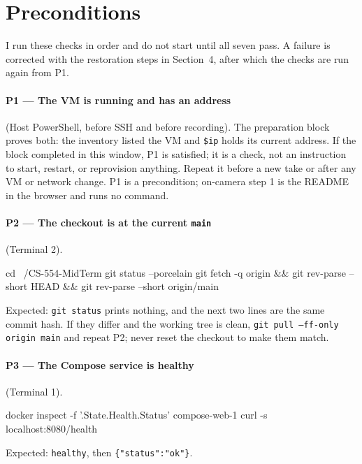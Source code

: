 \documentclass[11pt,letterpaper]{article}
\newcommand{\code}[1]{\texttt{#1}}
\begin{document}
\section{Preconditions}

I run these checks in order and do not start until all seven pass. A failure is corrected with the restoration steps in Section~4, after which the checks are run again from P1.

\paragraph{P1 --- The VM is running and has an address} (Host PowerShell, before SSH and before recording). The preparation block proves both: the inventory listed the VM and \code{\$ip} holds its current address. If the block completed in this window, P1 is satisfied; it is a check, not an instruction to start, restart, or reprovision anything. Repeat it before a new take or after any VM or network change. P1 is a precondition; on-camera step 1 is the README in the browser and runs no command.

\paragraph{P2 --- The checkout is at the current \code{main}} (Terminal 2).
\begin{cmd}
cd ~/CS-554-MidTerm
git status --porcelain
git fetch -q origin &&
    git rev-parse --short HEAD &&
    git rev-parse --short origin/main
\end{cmd}
Expected: \code{git status} prints nothing, and the next two lines are the same commit hash. If they differ and the working tree is clean, \code{git pull --ff-only origin main} and repeat P2; never reset the checkout to make them match.

\paragraph{P3 --- The Compose service is healthy} (Terminal 1).
\begin{cmd}
docker inspect -f '{{.State.Health.Status}}' compose-web-1
curl -s localhost:8080/health
\end{cmd}
Expected: \code{healthy}, then \code{\{"status":"ok"\}}.
\end{document}
